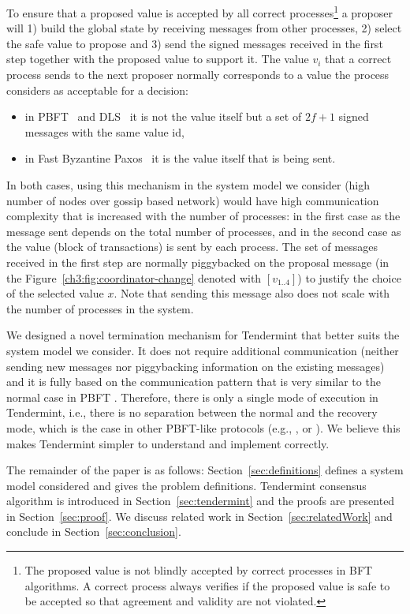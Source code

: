 To ensure that a proposed value is accepted by all correct
processes\footnote{The proposed value is not blindly accepted by correct
processes in BFT algorithms. A correct process always verifies if the proposed
value is safe to be accepted so that agreement and validity are not violated.}
a proposer will 1) build the global state by receiving messages from other
processes, 2) select the safe value to propose and 3) send the signed messages
received in the first step together with the proposed value to support it. The
value $v_i$ that a correct process sends to the next proposer normally
corresponds to a value the process considers as acceptable for a decision: 

\begin{itemize} \item in PBFT~\cite{CL99:osdi} and DLS~\cite{DLS88:jacm} it is
        not the value itself but a set of $2f+1$ signed messages with the same
    value id, \item in Fast Byzantine Paxos~\cite{MA06:tdsc} it is the value
        itself that is being sent.  \end{itemize}

In both cases, using this mechanism in the system model we consider (high
number of nodes over gossip based network) would have high communication
complexity that is increased with the number of processes: in the first case as
the message sent depends on the total number of processes, and in the second
case as the value (block of transactions) is sent by each process. The set of
messages received in the first step are normally piggybacked on the proposal
message (in the Figure~\ref{ch3:fig:coordinator-change} denoted with
$[v_{1..4}]$) to justify the choice of the selected value $x$. Note that
sending this message also does not scale with the number of processes in the
system.   

We designed a novel termination mechanism for Tendermint that better suits the
system model we consider. It does not require additional communication (neither
sending new messages nor piggybacking information on the existing messages) and
it is fully based on the communication pattern that is very similar to the
normal case in PBFT \cite{CL99:osdi}. Therefore, there is only a single mode of
execution in Tendermint, i.e., there is no separation between the normal and
the recovery mode, which is the case in other PBFT-like protocols (e.g.,
\cite{CL99:osdi}, \cite{Ver09:spinning} or \cite{Cle09:aardvark}). We believe
this makes Tendermint simpler to understand and implement correctly.  

The remainder of the paper is as follows: Section~\ref{sec:definitions} defines
a system model considered and gives the problem definitions. Tendermint
consensus algorithm is introduced in Section~\ref{sec:tendermint} and the
proofs are presented in Section~\ref{sec:proof}. We discuss related work in
Section~\ref{sec:relatedWork} and conclude in Section~\ref{sec:conclusion}.  
